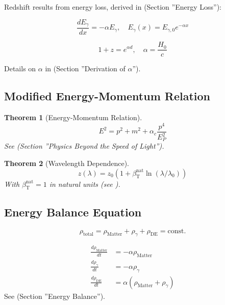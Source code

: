 \documentclass[a4paper,12pt]{article}
\newtheorem{theorem}{Theorem}[section]
\theoremstyle{definition}
\theoremstyle{remark}
\newcommand{\betaT}{\beta_{\text{T}}}
\begin{document}
	Redshift results from energy loss, derived in \cite{pascher_messdifferenzen_2025} (Section ''Energy Loss''):
	
	\begin{equation}
		\frac{d E_{\gamma}}{d x} = -\alpha E_{\gamma}, \quad E_{\gamma}(x) = E_{\gamma,0} e^{-\alpha x}
	\end{equation}
	
	\begin{equation}
		1 + z = e^{\alpha d}, \quad \alpha = \frac{H_0}{c}
	\end{equation}
	
	Details on \(\alpha\) in \cite{pascher_params_2025} (Section ''Derivation of \(\alpha\)'').
	
	\subsection{Modified Energy-Momentum Relation}
	
	\begin{theorem}[Energy-Momentum Relation]
		\begin{equation}
			E^2 = p^2 + m^2 + \alpha_c \frac{p^4}{E_P^2}
		\end{equation}
		See \cite{pascher_photons_2025} (Section ''Physics Beyond the Speed of Light'').
	\end{theorem}
	
	\begin{theorem}[Wavelength Dependence]
		\begin{equation}
			z(\lambda) = z_0 (1 + \betaT^{\text{nat}} \ln(\lambda/\lambda_0))
		\end{equation}
		With \(\betaT^{\text{nat}} = 1\) in natural units (see \cite{pascher_params_2025}).
	\end{theorem}
	
	\subsection{Energy Balance Equation}
	
	\begin{equation}
		\rho_{\text{total}} = \rho_{\text{Matter}} + \rho_{\gamma} + \rho_{\text{DE}} = \text{const.}
	\end{equation}
	
	\begin{align}
		\frac{d \rho_{\text{Matter}}}{d t} &= -\alpha \rho_{\text{Matter}} \\
		\frac{d \rho_{\gamma}}{d t} &= -\alpha \rho_{\gamma} \\
		\frac{d \rho_{\text{DE}}}{d t} &= \alpha (\rho_{\text{Matter}} + \rho_{\gamma})
	\end{align}
	See \cite{pascher_messdifferenzen_2025} (Section ''Energy Balance'').
	
\end{document}
